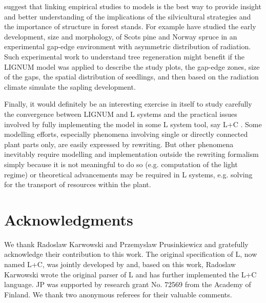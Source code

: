 \citet{coates:03} suggest that linking  empirical studies to models is
the  best way  to  provide  insight and  better  understanding of  the
implications  of the  silvicultural strategies  and the  importance of
structure  in  forest  stands.   For example  \citet{chantal:03}  have
studied the early development, size  and morphology, of Scots pine and
Norway spruce in an  experimental gap-edge environment with asymmetric
distribution of  radiation. Such experimental work  to understand tree
regeneration might benefit if the LIGNUM model was applied to describe
the study  plots, the  gap-edge zones, size  of the gaps,  the spatial
distribution  of seedlings, and  then based  on the  radiation climate
simulate the sapling development.

Finally, it would  definitely be an interesting exercise  in itself to
study carefully the  convergence between LIGNUM and L  systems and the
practical issues  involved by fully  implementing the model in  some L
system  tool, say L+C  \citep{karwowski:02}.  Some  modelling efforts,
especially  phenomena  involving single  or  directly connected  plant
parts only,  are easily expressed  by rewriting.  But  other phenomena
inevitably require modelling  and implementation outside the rewriting
formalism  simply  because  it  is  not  meaningful  to  do  so  (e.g.
computation of  the light regime)  or theoretical advancements  may be
required in  L systems, e.g.   solving for the transport  of resources
within the plant.

\section{Acknowledgments}

We   thank  Radoslaw  Karwowski   and  Przemyslaw   Prusinkiewicz  and
gratefully acknowledge their contribution  to this work.  The original
specification  of   L,  now  named  L+C,  was   jointly  developed  by
\citet{pp:99a} and,  based on this work, Radoslaw  Karwowski wrote the
original parser of L and  has further implemented the L+C language. JP
was supported by research grant No. 72569 from the Academy of Finland.
We thank two anonymous referees for their valuable comments.